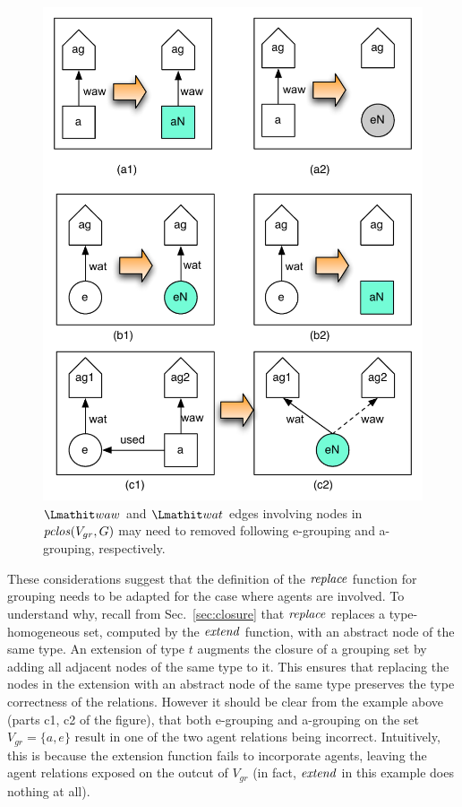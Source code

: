 \begin{figure}
\centering
\includegraphics[scale=.5]{figures/agents-relations-patterns}
\caption{$\waw$ and $\wat$ edges involving nodes in $\mathit{pclos}(V_{gr},G)$ may need to removed following e-grouping and a-grouping, respectively.}  \label{fig:agents-relations-patterns}
\end{figure}

%
These considerations suggest that the definition of the $\mathit{replace}$ function for grouping needs to be adapted for the case where agents are involved. 
%
To understand why, recall from Sec.~\ref{sec:closure} that $\mathit{replace}$ replaces a type-homogeneous set, computed by the $\mathit{extend}$ function, with an abstract node of the same type. An extension of type $t$ augments the closure of a grouping set by adding all adjacent nodes of the same type to it. This ensures that replacing the nodes in the extension with an abstract node of the same type preserves the type correctness of the relations. 
%
However it should be clear from the example above (parts c1, c2 of the figure), that both e-grouping and a-grouping on the set  $V_{gr} = \{ a, e\}$  result in one of the two agent relations being incorrect. Intuitively, this is because the extension function fails to incorporate agents, leaving the agent relations exposed on the outcut of $V_{gr}$ (in fact, $\mathit{extend}$ in this example does nothing at all).

